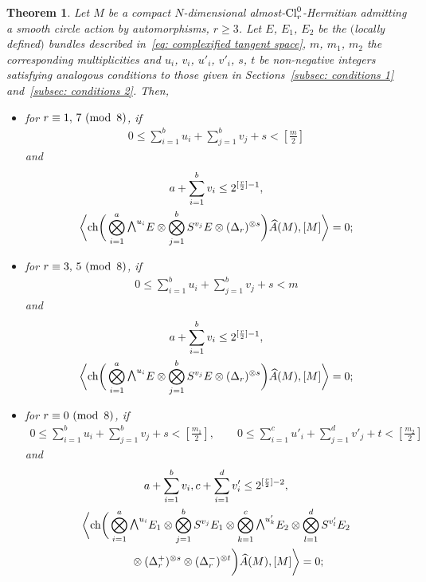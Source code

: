 \documentclass[pdftex]{sigma}
\newcommand{\A}{\mbox{$\widehat A$}}
\newcommand{\ext}{\raise1pt\hbox{$\textstyle\bigwedge$}}
\newcommand{\sym}{S}
\newcommand{\ch}{\mbox{\rm ch}}
\numberwithin{equation}{section}
\newtheorem{Theorem}{Theorem}[section]
\begin{document}
\begin{Theorem}\label{theo: vanishing 3} Let $M$ be a compact $N$-dimensional almost-${\rm Cl}_r^0$-Hermitian admitting a smooth circle action by automorphisms, $r\geq 3$. Let $E$, $E_1$, $E_2$ be the $($locally defined$)$ bundles described in~\eqref{eq: complexified tangent space}, $m$, $m_1$, $m_2$ the corresponding multiplicities and $u_i$, $v_i$, $u'_i$, $v'_i$, $s$, $t$ be non-negative integers satisfying analogous conditions to those given in Sections~{\rm \ref{subsec: conditions 1}} and~{\rm \ref{subsec: conditions 2}}. Then,
 \begin{itemize}\itemsep=0pt
\item for $r\equiv 1,\,7 \,\,({\rm mod\,\,\,} 8)$, if
 \begin{gather*}
 0\leq \sum_{i=1}^b u_i+\sum_{j=1}^b v_j+s<\left[\frac{m}{2}\right]
\end{gather*}
and
\begin{gather*}
 a + \sum_{i=1}^b v_i\leq 2^{[{r\over 2}]-1}, \\
 \bigg\langle \ch\bigg(\bigotimes_{i=1}^a\ext^{u_i}E\otimes \bigotimes_{j=1}^b\sym^{v_j} E\otimes (\Delta_r)^{\otimes s}\bigg)\A(M),[M]\bigg\rangle =0;\end{gather*}

\item for $r\equiv 3,\,5 \,\,({\rm mod\,\,\,} 8)$, if
 \begin{gather*}
 0\leq \sum_{i=1}^b u_i+\sum_{j=1}^b v_j+s<m
 \end{gather*}
 and
 \begin{gather*}
 a + \sum_{i=1}^b v_i\leq 2^{[{r\over 2}]-1}, \\
 \bigg\langle \ch\bigg(\bigotimes_{i=1}^a \ext^{u_i}E\otimes\bigotimes_{j=1}^b \sym^{v_j} E\otimes(\Delta_r)^{\otimes s}\bigg)\A(M),[M]\bigg\rangle =0;\end{gather*}

\item for $r\equiv 0 \,\,({\rm mod\,\,\,} 8)$, if
 \begin{gather*}
 0\leq \sum_{i=1}^b u_i+\sum_{j=1}^b v_j+s <\left[\frac{m_1}{2}\right], \qquad 0\leq \sum_{i=1}^c u'_i+\sum_{j=1}^d v'_j+t<\left[\frac{m_2}{2}\right]
 \end{gather*} and
 \begin{gather*}
 a + \sum_{i=1}^b v_i, c + \sum_{i=1}^d v'_i\leq 2^{[{r\over 2}]-2}, \\
 \bigg\langle \ch\bigg(\bigotimes_{i=1}^a\ext^{u_i}E_1\otimes\bigotimes_{j=1}^b\sym^{v_j} E_1 \otimes
 \bigotimes_{k=1}^c\ext^{u'_k}E_2\otimes\bigotimes_{l=1}^d\sym^{v'_l} E_2 \\
 \qquad{} \otimes (\Delta_r^+)^{\otimes s}\otimes(\Delta_r^-)^{\otimes t} \bigg)
 \A(M),[M]\bigg\rangle =0;\end{gather*}


\end{itemize}
\end{Theorem}
\end{document}
